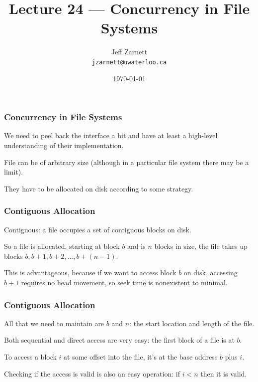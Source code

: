 

\title{Lecture 24 --- Concurrency in File Systems }

\author{Jeff Zarnett \\ \small \texttt{jzarnett@uwaterloo.ca}}
\date{\today}




\begin{frame}
	\titlepage

\end{frame}


\begin{frame}
	\frametitle{Concurrency in File Systems}

	We need to peel back the interface a bit and have at least a high-level understanding of their implementation.

	File can be of arbitrary size (although in a particular file system there may be a limit).

	They have to be allocated on disk according to some strategy.

\end{frame}

\begin{frame}
	\frametitle{Contiguous Allocation}
	Contiguous: a file occupies a set of contiguous blocks on disk.

	So a file is allocated, starting at block $b$ and is $n$ blocks in size, the file takes up blocks $b, b+1, b+2, ..., b+(n-1)$.

	This is advantageous, because if we want to access block $b$ on disk, accessing $b+1$ requires no head movement, so seek time is nonexistent to minimal.

\end{frame}

\begin{frame}
	\frametitle{Contiguous Allocation}

	All that we need to maintain are $b$ and $n$: the start location and length of the file.

	Both sequential and direct access are very easy: the first block of a file is at $b$.

	To access a block $i$ at some offset into the file, it's at the base address $b$ plus $i$.

	Checking if the access is valid is also an easy operation: if $i < n$ then it is valid.

\end{frame}

